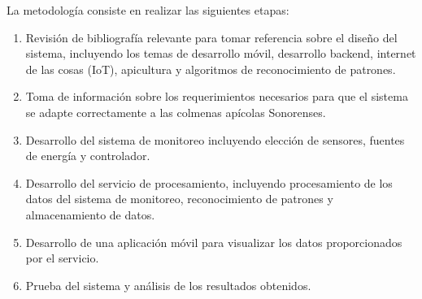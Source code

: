
La metodología consiste en realizar las siguientes etapas:
\begin{enumerate}
    \item Revisión de bibliografía relevante para tomar referencia sobre el diseño del sistema, incluyendo los temas de desarrollo móvil, desarrollo backend, internet de las cosas (IoT), apicultura y algoritmos de reconocimiento de patrones.
    \item Toma de información sobre los requerimientos necesarios para que el sistema se adapte correctamente a las colmenas apícolas Sonorenses.
    \item Desarrollo del sistema de monitoreo incluyendo elección de sensores, fuentes de energía y controlador.
    \item Desarrollo del servicio de procesamiento, incluyendo procesamiento de los datos del sistema de monitoreo, reconocimiento de patrones y almacenamiento de datos.
    \item Desarrollo de una aplicación móvil para visualizar los datos proporcionados por el servicio.
    \item Prueba del sistema y análisis de los resultados obtenidos.
\end{enumerate}
